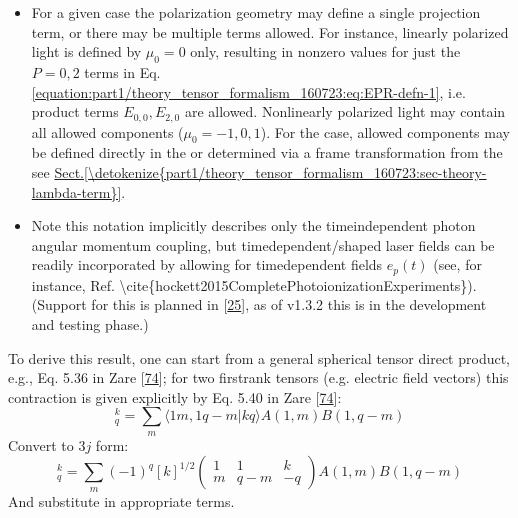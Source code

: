 \documentclass[letterpaper,table,10pt,english]{jupyterBook}
\begin{document}
\begin{itemize}
\item {} 
\sphinxAtStartPar
For a given case the polarization geometry may define a single projection term, or there may be multiple terms allowed. For instance, linearly polarized light is defined by \(\mu_0=0\) only, resulting in non\sphinxhyphen{}zero values for just the \(P=0,2\) terms in Eq. \eqref{equation:part1/theory_tensor_formalism_160723:eq:EPR-defn-1}, i.e. product terms \(E_{0,0}, E_{2,0}\) are allowed. Non\sphinxhyphen{}linearly polarized light may contain all allowed components (\(\mu_0=-1,0,1\)). For the {\hyperref[\detokenize{backmatter/glossary:term-MF}]{}} case, allowed components may be defined directly in the {\hyperref[\detokenize{backmatter/glossary:term-MF}]{}} or determined via a frame transformation from the {\hyperref[\detokenize{backmatter/glossary:term-LF}]{}} \sphinxhyphen{} see \hyperref[\detokenize{part1/theory_tensor_formalism_160723:sec-theory-lambda-term}]{Sect.\@ \ref{\detokenize{part1/theory_tensor_formalism_160723:sec-theory-lambda-term}}}.

\item {} 
\sphinxAtStartPar
Note this notation implicitly describes only the time\sphinxhyphen{}independent photon angular momentum coupling, but time\sphinxhyphen{}dependent/shaped laser fields can be readily incorporated by allowing for time\sphinxhyphen{}dependent fields \(e_{p}(t)\) (see, for instance, Ref. \textbackslash{}cite\{hockett2015CompletePhotoionizationExperiments\}). (Support for this is planned in  {[}\hyperlink{cite.backmatter/bibliography:id597}{25}{]}, as of v1.3.2 this is in the development and testing phase.)

\end{itemize}

\sphinxAtStartPar
To derive this result, one can start from a general spherical tensor direct product, e.g., Eq. 5.36 in Zare {[}\hyperlink{cite.backmatter/bibliography:id968}{74}{]}; for two first\sphinxhyphen{}rank tensors (e.g. electric field vectors) this contraction is given explicitly by Eq. 5.40 in Zare {[}\hyperlink{cite.backmatter/bibliography:id968}{74}{]}:
\label{equation:part1/theory_tensor_formalism_160723:d6c5e5fd-2128-4cf7-9669-ded79d08042f}\begin{equation}
[A^{(1)}\otimes B^{(1)}]_{q}^{k}=\sum_{m}\langle1m,1q-m|kq\rangle A(1,m)B(1,q-m)
\end{equation}
\sphinxAtStartPar
Convert to \(3j\) form:
\label{equation:part1/theory_tensor_formalism_160723:3d1245c7-47a0-4153-b56e-e353e808c747}\begin{equation}
[A^{(1)}\otimes B^{(1)}]_{q}^{k}=\sum_{m}(-1)^{q}[k]^{1/2}\left(\begin{array}{ccc}
1 & 1 & k\\
m & q-m & -q
\end{array}\right)A(1,m)B(1,q-m)
\end{equation}
\sphinxAtStartPar
And substitute in appropriate terms.
\end{document}
